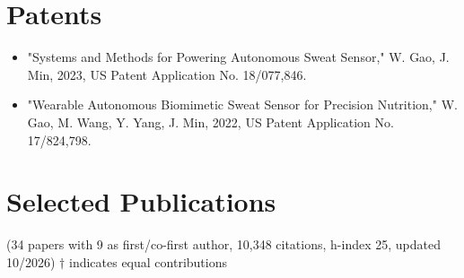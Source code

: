 \documentclass[11pt,a4paper]{article}
\begin{document}
\section{Patents}
\begin{itemize}[leftmargin=*, itemsep=2pt, parsep=0pt, topsep=2pt]
  \item "Systems and Methods for Powering Autonomous Sweat Sensor," W. Gao, J. Min, 2023, US Patent Application No. 18/077,846.
  \item "Wearable Autonomous Biomimetic Sweat Sensor for Precision Nutrition," W. Gao, M. Wang, Y. Yang, J. Min, 2022, US Patent Application No. 17/824,798.
\end{itemize}

\section{Selected Publications}
(34 papers with 9 as first/co-first author, 10,348 citations, h-index 25, updated 10/2026)
$\dagger$ indicates equal contributions
\end{document}
